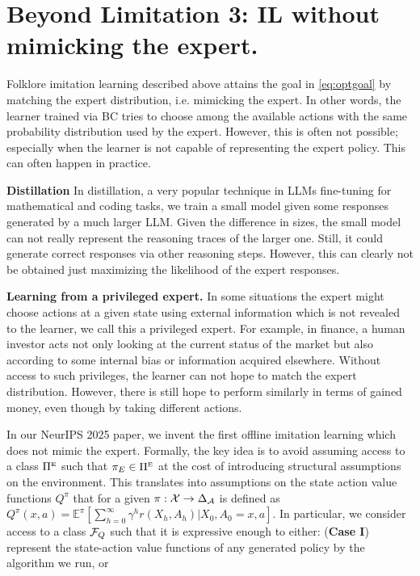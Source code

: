 \documentclass{article}
\begin{document}
\section{Beyond Limitation 3: IL without mimicking the expert.}
Folklore imitation learning described above attains the goal in \eqref{eq:optgoal} by 
matching the expert distribution, i.e. mimicking the expert. In other words, the learner
trained via BC tries to choose among the available 
actions with the same probability distribution used by the expert.
However, this is often not possible; especially when the learner is not capable of representing the expert policy. This can often happen in practice.
\begin{example}\textbf{Distillation}
In distillation, a very popular technique in LLMs fine-tuning for mathematical and coding tasks, we train a small model
given some responses generated by a much larger LLM. Given the difference in sizes, the small model can not really represent
the reasoning traces of the larger one. Still, it could generate correct responses via other reasoning steps. However, this can clearly not be obtained 
just maximizing the likelihood of the expert responses. 
\end{example}
\begin{example}\textbf{Learning from a privileged expert.}
In some situations the expert might choose actions at a given state using external information which is not revealed to the learner, we call this a privileged expert.
For example, in finance, a human investor acts not only looking at the current status of the market but also according to some internal bias
or information acquired elsewhere. Without access to such privileges, the learner can not hope to match 
the expert distribution. However, there is still hope to perform similarly in terms of gained money, even though by taking different actions.
\end{example}
In our NeurIPS 2025 paper,  we invent the first offline imitation learning which does not mimic the expert.
Formally, the key idea is to avoid assuming access to a class ${\Pi^{\scriptscriptstyle\textup{E}}}$ such that ${\pi_E} \in {\Pi^{\scriptscriptstyle\textup{E}}}$ at the cost of introducing structural assumptions on the environment.
This translates into assumptions on the state action value functions $Q^\pi$ that for a given $\pi:\mathcal{X}\rightarrow \Delta_{\mathcal{A}}$ is defined as $Q^\pi(x,a) = \mathbb{E}^\pi[\sum^{\infty}_{h=0} \gamma^h r(X_h, A_h) | X_0, A_0 = x,a]$.
In particular, we consider access to a class ${\mathcal{F}_Q}$ such that it is expressive enough to either:
(\textbf{Case I}) represent the state-action value functions of any generated policy by the algorithm we run, or 
\end{document}
